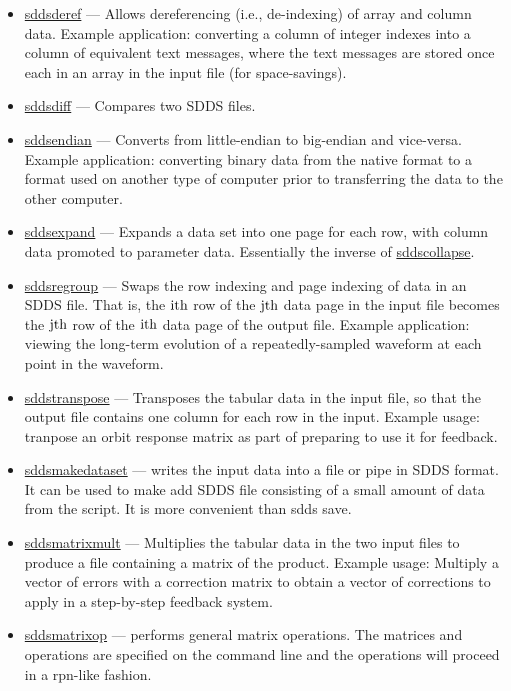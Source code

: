\documentclass[11pt]{article}
\newcommand{\progref}[1]{\hyperref{#1}{{\tt #1} (}{)}{#1}}
\begin{document}
\begin{itemize}
\item \progref{sddsderef} --- Allows dereferencing (i.e., de-indexing) of array and column data.  Example
application: converting a column of integer indexes into a column of equivalent text messages, where the text
messages are stored once each in an array in the input file (for space-savings).
\item \progref{sddsdiff} --- Compares two SDDS files.

\item \progref{sddsendian} --- Converts from little-endian to
big-endian and vice-versa.  Example application: converting binary
data from the native format to a format used on another type of
computer prior to transferring the data to the other computer.

\item \progref{sddsexpand} --- Expands a data set into one page for each row, with column data promoted
to parameter data.  Essentially the inverse of \progref{sddscollapse}. 

\item \progref{sddsregroup} --- Swaps the row indexing and page
indexing of data in an SDDS file. That is, the ${\rm i {th}}$ row of
the ${\rm j {th}}$ data page in the input file becomes the ${\rm
j{th}}$ row of the ${\rm i {th}}$ data page of the output file.
Example application: viewing the long-term evolution of a
repeatedly-sampled waveform at each point in the waveform.

\item \progref{sddstranspose} --- Transposes the tabular data in the
input file, so that the output file contains one column for each row
in the input.  Example usage: tranpose an orbit response matrix as
part of preparing to use it for feedback.

\item \progref{sddsmakedataset} --- writes the input data into a file or 
pipe in SDDS format. It can be used to make add SDDS file consisting of
a small amount of data from the script. It is more convenient than {sdds save}.

\item \progref{sddsmatrixmult} --- Multiplies the tabular data in the
two input files to produce a file containing a matrix of the product.
Example usage: Multiply a vector of errors with a correction matrix to
obtain a vector of corrections to apply in a step-by-step feedback
system.

\item \progref{sddsmatrixop} --- performs general matrix operations. 
The matrices and operations are specified on the command line and 
the operations will proceed in a rpn-like fashion.


\end{itemize}
\end{document}
